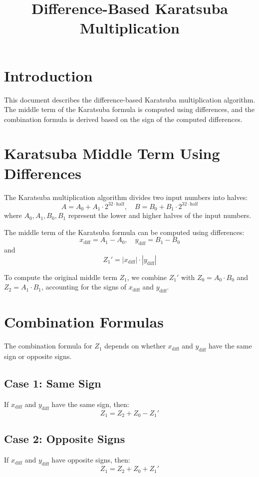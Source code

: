 \documentclass[12pt]{article}
\title{Difference-Based Karatsuba Multiplication}
\author{}
\date{}
\begin{document}
\maketitle

\section*{Introduction}
This document describes the difference-based Karatsuba multiplication algorithm. The middle term of the Karatsuba formula is computed using differences, and the combination formula is derived based on the sign of the computed differences.

\section*{Karatsuba Middle Term Using Differences}
The Karatsuba multiplication algorithm divides two input numbers into halves:
\[
A = A_0 + A_1 \cdot 2^{32 \cdot \text{half}}, \quad B = B_0 + B_1 \cdot 2^{32 \cdot \text{half}}
\]
where \( A_0, A_1, B_0, B_1 \) represent the lower and higher halves of the input numbers.

The middle term of the Karatsuba formula can be computed using differences:
\[
x_{\text{diff}} = A_1 - A_0, \quad y_{\text{diff}} = B_1 - B_0
\]
and
\[
Z_1' = |x_{\text{diff}}| \cdot |y_{\text{diff}}|
\]

To compute the original middle term \( Z_1 \), we combine \( Z_1' \) with \( Z_0 = A_0 \cdot B_0 \) and \( Z_2 = A_1 \cdot B_1 \), accounting for the signs of \( x_{\text{diff}} \) and \( y_{\text{diff}} \).

\section*{Combination Formulas}
The combination formula for \( Z_1 \) depends on whether \( x_{\text{diff}} \) and \( y_{\text{diff}} \) have the same sign or opposite signs.

\subsection*{Case 1: Same Sign}
If \( x_{\text{diff}} \) and \( y_{\text{diff}} \) have the same sign, then:
\[
Z_1 = Z_2 + Z_0 - Z_1'
\]

\subsection*{Case 2: Opposite Signs}
If \( x_{\text{diff}} \) and \( y_{\text{diff}} \) have opposite signs, then:
\[
Z_1 = Z_2 + Z_0 + Z_1'
\]
\end{document}
